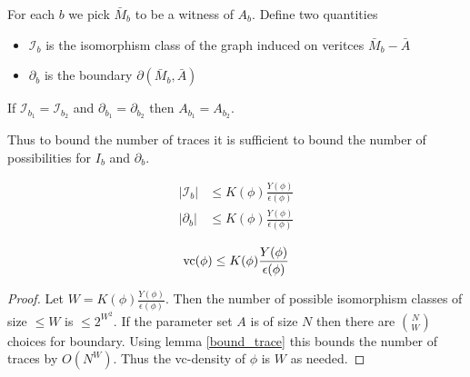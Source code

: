 \documentclass{amsart}
\newcommand{\II}{\mathscr I}
\begin{document}
\begin{Definition}
	For each $b$ we pick $\bar M_b$ to be a witness of $A_b$. Define two quantities
	\begin{itemize}
		\item $\II_b$ is the isomorphism class of the graph induced on veritces $\bar M_b - \bar A$ %
		\item $\partial_b$ is the boundary $\partial(\bar M_b, \bar A)$
	\end{itemize}
\end{Definition}

\begin{Lemma} \label {bound_trace}
	If $\II_{b_1} = \II_{b_2}$ and $\partial_{b_1} = \partial_{b_2}$ then $A_{b_1} = A_{b_2}$.
\end{Lemma}

Thus to bound the number of traces it is sufficient to bound the number of possibilities for $I_b$ and $\partial_b$.

\begin{Theorem} \label{main_bound}
	\begin{align*}
		|\II_b| &\leq K(\phi) \frac{Y(\phi)}{\epsilon(\phi)}\\
		|\partial_b| &\leq K(\phi) \frac{Y(\phi)}{\epsilon(\phi)}
	\end{align*}
\end{Theorem}

\begin{Corollary}
	\begin{align*}
		\operatorname{vc}(\phi) \leq K(\phi) \frac{Y(\phi)}{\epsilon(\phi)}
	\end{align*}
\end{Corollary}

\begin{proof}
		Let $W = K(\phi) \frac{Y(\phi)}{\epsilon(\phi)}$.
		Then the number of possible isomorphism classes of size $\leq W$ is $\leq 2^{W^2}$.
		If the parameter set $A$ is of size $N$ then there are $N \choose W$ choices for boundary.
		Using lemma \ref{bound_trace} this bounds the number of traces by $O(N^W)$.
		Thus the vc-density of $\phi$ is $W$ as needed.
\end{proof}
\end{document}
